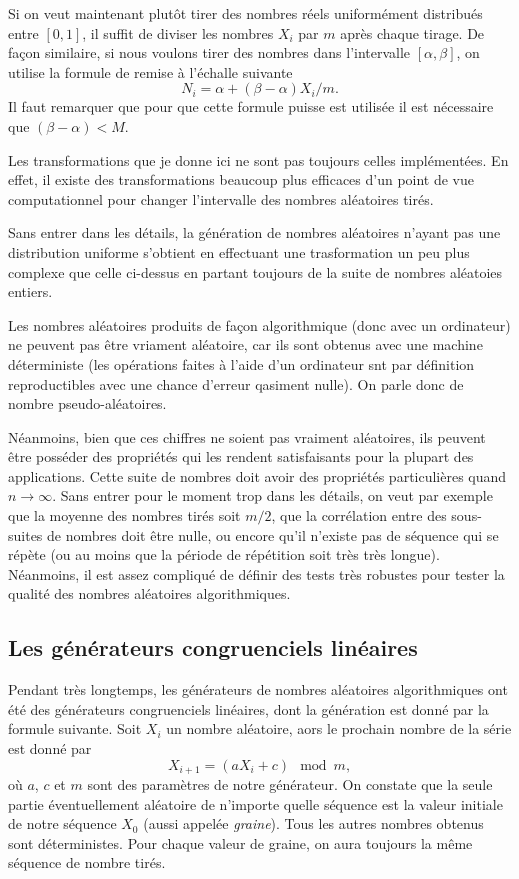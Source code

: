 \documentclass[a4paper,12pt]{book}
\begin{document}
Si on veut maintenant plutôt tirer des nombres réels uniformément distribués entre $[0,1]$, il suffit
de diviser les nombres $X_i$ par $m$ après chaque tirage. De façon similaire, si nous voulons 
tirer des nombres dans l'intervalle $[\alpha,\beta]$, on utilise la formule de remise à l'échalle suivante
\begin{equation}
 N_i=\alpha+(\beta-\alpha)X_i/m.
\end{equation}
Il faut remarquer que pour que cette formule puisse est utilisée il est nécessaire que $(\beta-\alpha)<M$.

Les transformations que je donne ici ne sont pas toujours celles implémentées. En effet,
il existe des transformations beaucoup plus efficaces d'un point de vue computationnel
pour changer l'intervalle des nombres aléatoires tirés.

Sans entrer dans les détails, la génération de nombres aléatoires n'ayant pas une distribution
uniforme s'obtient en effectuant une trasformation un peu plus complexe que celle ci-dessus
en partant toujours de la suite de nombres aléatoies entiers.

Les nombres aléatoires produits de façon algorithmique (donc avec un ordinateur)
ne peuvent pas être vriament aléatoire, car ils sont obtenus avec une machine 
déterministe (les opérations faites à l'aide d'un ordinateur snt par définition
reproductibles avec une chance d'erreur qasiment nulle). On parle donc de nombre pseudo-aléatoires.

Néanmoins, bien que ces chiffres ne soient pas vraiment aléatoires, ils peuvent 
être posséder des propriétés qui les rendent satisfaisants pour la plupart des applications. Cette suite de nombres doit avoir des propriétés particulières quand $n\rightarrow\infty$.
Sans entrer pour le moment trop dans les détails, on veut par exemple que 
la moyenne des nombres tirés soit $m/2$, que la corrélation entre des 
sous-suites de nombres doit être nulle, ou encore qu'il n'existe pas de séquence qui se 
répète (ou au moins que la période de répétition soit très très longue).
Néanmoins, il est assez compliqué de définir des tests
très robustes pour tester la qualité des nombres aléatoires algorithmiques.


\subsection{Les générateurs congruenciels linéaires}\label{sec_congr}

Pendant très longtemps, les générateurs de nombres aléatoires algorithmiques
ont été des générateurs congruenciels linéaires, dont la génération est 
donné par la formule suivante. Soit $X_i$ un nombre aléatoire,
aors le prochain nombre de la série est donné par
\begin{equation}
X_{i+1}=(aX_i+c)\mod m,
\end{equation}
où $a$, $c$ et $m$ sont des paramètres de notre générateur. 
On constate que la seule partie 
éventuellement aléatoire de n'importe quelle séquence est la valeur initiale 
de notre séquence $X_0$ (aussi appelée \textit{graine}). 
Tous les autres nombres obtenus sont déterministes. Pour chaque valeur de graine, 
on aura toujours la même séquence de nombre tirés.
\end{document}
